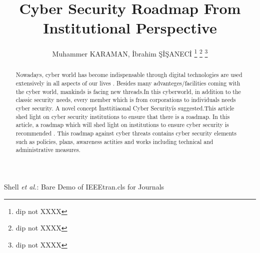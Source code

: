 \documentclass[journal]{IEEEtran}
\begin{document}
\title{Cyber Security Roadmap From Institutional Perspective}

\author{Muhammer KARAMAN, İbrahim ŞİŞANECİ%
\thanks{dip not XXXX}%
\thanks{dip not XXXX}%
\thanks{dip not XXXX}}

%
%


%
{Shell \MakeLowercase{\textit{et al.}}: Bare Demo of IEEEtran.cls for Journals}


\maketitle


\begin{abstract}
Nowadays, cyber world has become indispensable through digital technologies are used extensively in all aspects of our lives . Besides many advanteges/facilities coming with the cyber world, mankinds is facing new threads.In this cyberworld, in addition to the classic security needs, every member which is from corporations to individuals needs cyber security. A novel concept \"Insttitiaonal Cyber Security\" is suggested.This article shed light on cyber security institutions to ensure that there is a roadmap. In this article, a roadmap which will shed light on institutions to ensure cyber security is recommended . This roadmap against cyber threats contains cyber security elements such as policies, plans, awareness actities  and works including technical and administrative measures.

\end{abstract}
\end{document}
